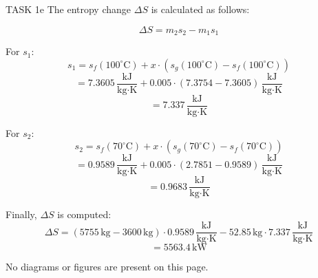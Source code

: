 TASK 1e  
The entropy change \( \Delta S \) is calculated as follows:  

\[
\Delta S = m_2 s_2 - m_1 s_1
\]

For \( s_1 \):  
\[
s_1 = s_f(100^\circ\text{C}) + x \cdot \left( s_g(100^\circ\text{C}) - s_f(100^\circ\text{C}) \right)
\]
\[
= 7.3605 \, \frac{\text{kJ}}{\text{kg·K}} + 0.005 \cdot \left( 7.3754 - 7.3605 \right) \, \frac{\text{kJ}}{\text{kg·K}}
\]
\[
= 7.337 \, \frac{\text{kJ}}{\text{kg·K}}
\]

For \( s_2 \):  
\[
s_2 = s_f(70^\circ\text{C}) + x \cdot \left( s_g(70^\circ\text{C}) - s_f(70^\circ\text{C}) \right)
\]
\[
= 0.9589 \, \frac{\text{kJ}}{\text{kg·K}} + 0.005 \cdot \left( 2.7851 - 0.9589 \right) \, \frac{\text{kJ}}{\text{kg·K}}
\]
\[
= 0.9683 \, \frac{\text{kJ}}{\text{kg·K}}
\]

Finally, \( \Delta S \) is computed:  
\[
\Delta S = \left( 5755 \, \text{kg} - 3600 \, \text{kg} \right) \cdot 0.9589 \, \frac{\text{kJ}}{\text{kg·K}} - 52.85 \, \text{kg} \cdot 7.337 \, \frac{\text{kJ}}{\text{kg·K}}
\]
\[
= 5563.4 \, \text{kW}
\]  

No diagrams or figures are present on this page.